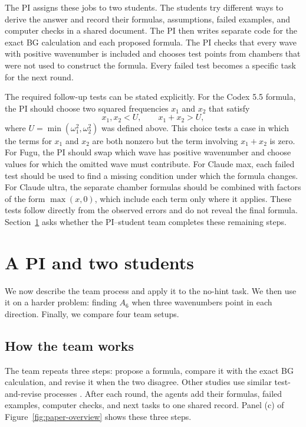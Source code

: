 \documentclass{article}
\begin{document}
The PI assigns these jobs to two students. The students
try different ways to derive the answer and record their formulas,
assumptions, failed examples, and computer checks in a shared document. The PI
then writes separate code for the exact BG calculation and each proposed
formula. The PI checks that every wave with positive wavenumber is included
and chooses test points from chambers that were not used to construct the
formula. Every failed test becomes a specific task for the next round.

The required follow-up tests can be stated explicitly. For the Codex 5.5
formula, the PI should choose two squared frequencies $x_1$ and $x_2$
that satisfy
\[
x_1,x_2<U,
\qquad
x_1+x_2>U,
\]
where $U=\min(\omega_1^2,\omega_2^2)$ was defined above. This choice tests a
case in which the terms for $x_1$ and $x_2$ are both nonzero but the term
involving $x_1+x_2$ is zero. For Fugu, the PI should swap which wave has
positive wavenumber and choose values for which the omitted wave must
contribute. For Claude max, each failed test should be used to find a missing
condition under which the formula changes. For Claude ultra, the separate
chamber formulas should be combined with factors of the form $\max(x,0)$,
which include each term only where it applies. These tests follow directly
from the observed errors and do not reveal the final formula.
Section~\ref{sec:multiagent} asks whether the PI--student team completes these
remaining steps.

\section{A PI and two students}
\label{sec:multiagent}

We now describe the team process and apply it to the no-hint task. We
then use it on a harder problem: finding $A_6$ when three wavenumbers point in
each direction. Finally, we compare four team setups.

\subsection{How the team works}
\label{sec:multiagent-workflow}

The team repeats three steps: propose a formula, compare it with the exact BG
calculation, and revise it when the two disagree. Other studies use similar
test-and-revise processes \citep{suttonbarto2018,madaan2023selfrefine,
Shinn2023Reflexion,Gou2024CRITIC,Wu2024ProCo}. After each round, the agents add
their formulas, failed examples, computer checks, and next tasks to one shared
record. Panel (c) of Figure~\ref{fig:paper-overview} shows these three steps.
\end{document}
